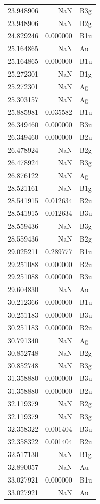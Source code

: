 \begin{longtable}{rrl}
23.948906 & NaN & B3g \\
23.948906 & NaN & B2g \\
24.829246 & 0.000000 & B1u \\
25.164865 & NaN & Au \\
25.164865 & 0.000000 & B1u \\
25.272301 & NaN & B1g \\
25.272301 & NaN & Ag \\
25.303157 & NaN & Ag \\
25.885981 & 0.035582 & B1u \\
26.349460 & 0.000000 & B3u \\
26.349460 & 0.000000 & B2u \\
26.478924 & NaN & B2g \\
26.478924 & NaN & B3g \\
26.876122 & NaN & Ag \\
28.521161 & NaN & B1g \\
28.541915 & 0.012634 & B2u \\
28.541915 & 0.012634 & B3u \\
28.559436 & NaN & B3g \\
28.559436 & NaN & B2g \\
29.025211 & 0.289777 & B1u \\
29.251088 & 0.000000 & B2u \\
29.251088 & 0.000000 & B3u \\
29.604830 & NaN & Au \\
30.212366 & 0.000000 & B1u \\
30.251183 & 0.000000 & B3u \\
30.251183 & 0.000000 & B2u \\
30.791340 & NaN & Ag \\
30.852748 & NaN & B2g \\
30.852748 & NaN & B3g \\
31.358880 & 0.000000 & B3u \\
31.358880 & 0.000000 & B2u \\
32.119379 & NaN & B2g \\
32.119379 & NaN & B3g \\
32.358322 & 0.001404 & B3u \\
32.358322 & 0.001404 & B2u \\
32.517130 & NaN & B1g \\
32.890057 & NaN & Au \\
33.027921 & 0.000000 & B1u \\
33.027921 & NaN & Au \\

\end{longtable}
